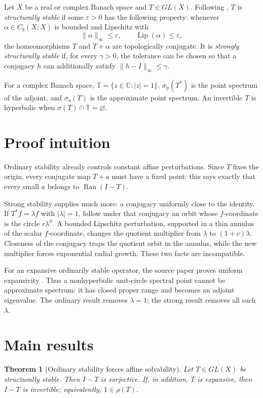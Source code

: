 \documentclass[11pt]{article}
\newtheorem{theorem}{Theorem}
\newcommand{\Torus}{\mathbb T}
\newcommand{\Cb}{C_b(X;X)}
\newcommand{\Lip}{\operatorname{Lip}}
\newcommand{\ran}{\operatorname{Ran}}
\newcommand{\spa}{\sigma_{\mathrm p}}
\newcommand{\saa}{\sigma_{\mathrm a}}
\newcommand{\rhoop}{\rho}
\begin{document}
Let $X$ be a real or complex Banach space and $T\in GL(X)$. Following \cite{BM19},
$T$ is \emph{structurally stable} if some $\varepsilon>0$ has the following property:
whenever $\alpha\in\Cb$ is bounded and Lipschitz with
\[
 \|\alpha\|_\infty\leq\varepsilon,
 \qquad \Lip(\alpha)\leq\varepsilon,
\]
the homeomorphisms $T$ and $T+\alpha$ are topologically conjugate. It is
\emph{strongly structurally stable} if, for every $\gamma>0$, the tolerance can be
chosen so that a conjugacy $h$ can additionally satisfy $\|h-I\|_\infty\leq\gamma$.

For a complex Banach space, $\Torus=\{z\in\mathbb C:|z|=1\}$,
$\spa(T^*)$ is the point spectrum of the adjoint, and $\saa(T)$ is the approximate
point spectrum. An invertible $T$ is hyperbolic when $\sigma(T)\cap\Torus=\varnothing$.

\section{Proof intuition}

Ordinary stability already controls constant affine perturbations. Since $T$ fixes the
origin, every conjugate map $T+a$ must have a fixed point; this says exactly that every
small $a$ belongs to $\ran(I-T)$.

Strong stability supplies much more: a conjugacy uniformly close to the identity. If
$T^*f=\lambda f$ with $|\lambda|=1$, follow under that conjugacy an orbit whose
$f$-coordinate is the circle $r\lambda^n$. A bounded Lipschitz perturbation, supported
in a thin annulus of the scalar $f$-coordinate, changes the quotient multiplier from
$\lambda$ to $(1+c)\lambda$. Closeness of the conjugacy traps the quotient orbit in the
annulus, while the new multiplier forces exponential radial growth. These two facts are
incompatible.

For an expansive ordinarily stable operator, the source paper proves uniform
expansivity \cite[Theorem~6(a)]{BM19}. Thus a nonhyperbolic unit-circle spectral point
cannot be approximate spectrum: it has closed proper range and becomes an adjoint
eigenvalue. The ordinary result removes $\lambda=1$; the strong result removes all such
$\lambda$.

\section{Main results}

\begin{theorem}[Ordinary stability forces affine solvability]\label{thm:onto}
Let $T\in GL(X)$ be structurally stable. Then $I-T$ is surjective. If, in addition,
$T$ is expansive, then $I-T$ is invertible; equivalently, $1\in\rhoop(T)$.
\end{theorem}
\end{document}
